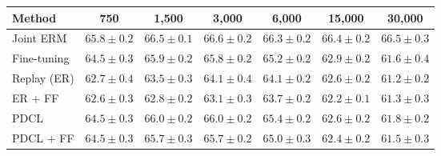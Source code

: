 \begin{tabular}{lcccccc}
\toprule
Method & 750 & 1{,}500 & 3{,}000 & 6{,}000 & 15{,}000 & 30{,}000 \\
\midrule
Joint ERM & $65.8\pm0.2$ & $66.5\pm0.1$ & $66.6\pm0.2$ & $66.3\pm0.2$ & $66.4\pm0.2$ & $66.5\pm0.3$ \\
\midrule
Fine-tuning & $64.5\pm0.3$ & $65.9\pm0.2$ & $65.8\pm0.2$ & $65.2\pm0.2$ & $62.9\pm0.2$ & $61.6\pm0.4$ \\
Replay (ER) & $62.7\pm0.4$ & $63.5\pm0.3$ & $64.1\pm0.4$ & $64.1\pm0.2$ & $62.6\pm0.2$ & $61.2\pm0.2$ \\
ER + FF & $62.6\pm0.3$ & $62.8\pm0.2$ & $63.1\pm0.3$ & $63.7\pm0.2$ & $62.2\pm0.1$ & $61.3\pm0.3$ \\
PDCL & $64.5\pm0.3$ & $66.0\pm0.2$ & $66.0\pm0.2$ & $65.4\pm0.2$ & $62.6\pm0.2$ & $61.8\pm0.2$ \\
PDCL + FF & $64.5\pm0.3$ & $65.7\pm0.3$ & $65.7\pm0.2$ & $65.0\pm0.3$ & $62.4\pm0.2$ & $61.5\pm0.3$ \\
\bottomrule
\end{tabular}
